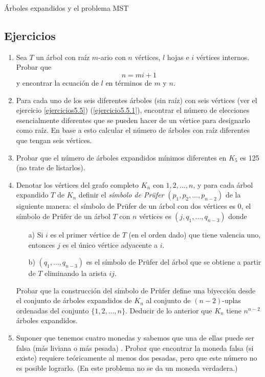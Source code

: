 \begin{section}{Árboles expandidos y el problema MST}
\section{Ejercicios}
\begin{enumerate}
\item Sea $T$ un árbol con raíz $m$-ario con $n$ vértices, $l$ hojas e
$i$ vértices internos. Probar que
$$ n=mi+1$$
y encontrar la ecuación de $l$ en términos de $m$ y $n$.

\item Para cada uno de los seis diferentes árboles (sin raíz) con seis
vértices (ver el ejercicio \ref{ejercicios5.5})
(\ref{ejercicio5.5.1}), encontrar el número de elecciones
esencialmente diferentes que se pueden hacer de un vértice para
designarlo como raíz. En base a esto calcular el número de árboles
con raíz diferentes que tengan seis vértices.

\item Probar que el número de árboles expandidos mínimos diferentes en
$K_5$ es 125 (no trate de listarlos).

\item Denotar los vértices del grafo completo $K_n$ con $1, 2,
\ldots,n$, y para cada árbol expandido $T$ de $K_n$ definir el
{\em símbolo de Prüfer} $(p_1,p_2,\ldots,p_{n-2})$ de la
 siguiente manera: el símbolo de Prüfer
de un árbol con dos vértices es $0$, el símbolo de Prüfer de un
árbol $T$ con $n$ vértices es $(j,q_1,\ldots,q_{n-3})$ donde
\begin{enumerate}
\item[a)]  Si $i$ es el primer vértice de $T$ (en el orden dado) que tiene
valencia uno, entonces $j$ es el único vértice adyacente a $i$.
\item[b)] $(q_1,\ldots,q_{n-3})$ es el símbolo de Prüfer del árbol que se
obtiene a partir de $T$ eliminando la arista $ij$.
\end{enumerate}
Probar que la construcción del símbolo de Prüfer define una
biyección desde el conjunto de árboles expandidos de $K_n$ al
conjunto de $(n-2)$-uplas ordenadas del conjunto
$\{1,2,\ldots,n\}$. Deducir de lo anterior que $K_n$ tiene
$n^{n-2}$ árboles expandidos.

 \item Suponer que tenemos cuatro monedas y sabemos que una de ellas
puede ser falsa (más liviana o más pesada) . Probar que encontrar
la moneda falsa (si existe) requiere teóricamente al menos dos
pesadas, pero que este número no es posible lograrlo. (En este
problema no se da un moneda verdadera.)
\end{enumerate}
\end{section}

